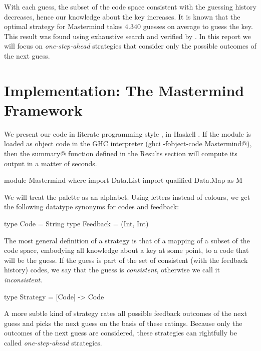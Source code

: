 \documentclass[a4paper]{article}
\makeatletter
\theoremstyle{definition}
\newcommand{\cmd}[1]{\Verb@#1@}
\makeatother
\begin{document}
With each guess, the subset of the code space consistent with the guessing history decreases, hence our knowledge about the key increases.
It is known that the optimal strategy for Mastermind takes $4.340$ guesses on average to guess the key.
This result was found using exhaustive search \citep{KoyomaLai1993:aoms} and verified by \citet{Ville2013:aoms}.
In this report we will focus on \emph{one-step-ahead} strategies that consider only the possible outcomes of the next guess.


\section*{Implementation: The Mastermind Framework}

We present our code in literate programming style \citep{Knuth1992:lp}, in Haskell \citep{Haskell:www}.
If the module is loaded as object code in the GHC interpreter (\cmd{ghci -fobject-code Mastermind}), then the \cmd{summary} function defined in the Results section will compute its output in a matter of seconds.

\begin{code}
module Mastermind where
import Data.List
import qualified Data.Map as M
\end{code}

We will treat the palette as an alphabet.
Using letters instead of colours, we get the following datatype synonyms for codes and feedback:

\begin{code}
type Code        = String
type Feedback    = (Int, Int)
\end{code}

The most general definition of a strategy is that of a mapping of a subset of the code space, embodying all knowledge about a key at some point, to a code that will be the guess.
If the guess is part of the set of consistent (with the feedback history) codes, we say that the guess is \emph{consistent}, otherwise we call it \emph{inconsistent}.

\begin{code}
type Strategy    = [Code] -> Code
\end{code}

A more subtle kind of strategy rates all possible feedback outcomes of the next guess and picks the next guess on the basis of these ratings.
Because only the outcomes of the next guess are considered, these strategies can rightfully be called \emph{one-step-ahead} strategies.
\end{document}
